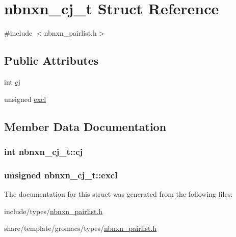 \hypertarget{structnbnxn__cj__t}{\section{nbnxn\-\_\-cj\-\_\-t \-Struct \-Reference}
\label{structnbnxn__cj__t}
}


{\ttfamily \#include $<$nbnxn\-\_\-pairlist.\-h$>$}

\subsection*{\-Public \-Attributes}
\begin{DoxyCompactItemize}
\item 
int \hyperlink{structnbnxn__cj__t_a9c253d9be26ca4e57d63a3c8c3ac12ae}{cj}
\item 
unsigned \hyperlink{structnbnxn__cj__t_a0064c075dc918dce82a79ce0c1c41a8a}{excl}
\end{DoxyCompactItemize}


\subsection{\-Member \-Data \-Documentation}
\hypertarget{structnbnxn__cj__t_a9c253d9be26ca4e57d63a3c8c3ac12ae}{
\subsubsection[{cj}]{\setlength{\rightskip}{0pt plus 5cm}int {\bf nbnxn\-\_\-cj\-\_\-t\-::cj}}}\label{structnbnxn__cj__t_a9c253d9be26ca4e57d63a3c8c3ac12ae}
\hypertarget{structnbnxn__cj__t_a0064c075dc918dce82a79ce0c1c41a8a}{
\subsubsection[{excl}]{\setlength{\rightskip}{0pt plus 5cm}unsigned {\bf nbnxn\-\_\-cj\-\_\-t\-::excl}}}\label{structnbnxn__cj__t_a0064c075dc918dce82a79ce0c1c41a8a}


\-The documentation for this struct was generated from the following files\-:\begin{DoxyCompactItemize}
\item 
include/types/\hyperlink{include_2types_2nbnxn__pairlist_8h}{nbnxn\-\_\-pairlist.\-h}\item 
share/template/gromacs/types/\hyperlink{share_2template_2gromacs_2types_2nbnxn__pairlist_8h}{nbnxn\-\_\-pairlist.\-h}\end{DoxyCompactItemize}
